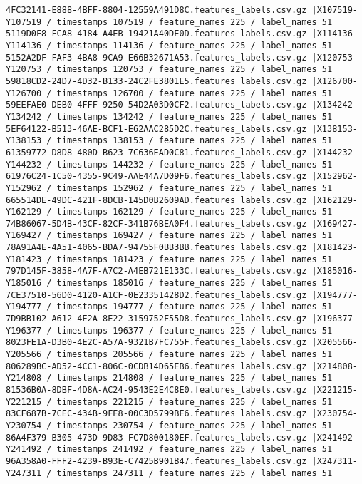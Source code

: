 \documentclass{UoNMCHA}
\numberwithin{equation}{section}
\begin{document}
\begin{lstlisting}
4FC32141-E888-4BFF-8804-12559A491D8C.features_labels.csv.gz |X107519-Y107519 / timestamps 107519 / feature_names 225 / label_names 51
5119D0F8-FCA8-4184-A4EB-19421A40DE0D.features_labels.csv.gz |X114136-Y114136 / timestamps 114136 / feature_names 225 / label_names 51
5152A2DF-FAF3-4BA8-9CA9-E66B32671A53.features_labels.csv.gz |X120753-Y120753 / timestamps 120753 / feature_names 225 / label_names 51
59818CD2-24D7-4D32-B133-24C2FE3801E5.features_labels.csv.gz |X126700-Y126700 / timestamps 126700 / feature_names 225 / label_names 51
59EEFAE0-DEB0-4FFF-9250-54D2A03D0CF2.features_labels.csv.gz |X134242-Y134242 / timestamps 134242 / feature_names 225 / label_names 51
5EF64122-B513-46AE-BCF1-E62AAC285D2C.features_labels.csv.gz |X138153-Y138153 / timestamps 138153 / feature_names 225 / label_names 51
61359772-D8D8-480D-B623-7C636EAD0C81.features_labels.csv.gz |X144232-Y144232 / timestamps 144232 / feature_names 225 / label_names 51
61976C24-1C50-4355-9C49-AAE44A7D09F6.features_labels.csv.gz |X152962-Y152962 / timestamps 152962 / feature_names 225 / label_names 51
665514DE-49DC-421F-8DCB-145D0B2609AD.features_labels.csv.gz |X162129-Y162129 / timestamps 162129 / feature_names 225 / label_names 51
74B86067-5D4B-43CF-82CF-341B76BEA0F4.features_labels.csv.gz |X169427-Y169427 / timestamps 169427 / feature_names 225 / label_names 51
78A91A4E-4A51-4065-BDA7-94755F0BB3BB.features_labels.csv.gz |X181423-Y181423 / timestamps 181423 / feature_names 225 / label_names 51
797D145F-3858-4A7F-A7C2-A4EB721E133C.features_labels.csv.gz |X185016-Y185016 / timestamps 185016 / feature_names 225 / label_names 51
7CE37510-56D0-4120-A1CF-0E23351428D2.features_labels.csv.gz |X194777-Y194777 / timestamps 194777 / feature_names 225 / label_names 51
7D9BB102-A612-4E2A-8E22-3159752F55D8.features_labels.csv.gz |X196377-Y196377 / timestamps 196377 / feature_names 225 / label_names 51
8023FE1A-D3B0-4E2C-A57A-9321B7FC755F.features_labels.csv.gz |X205566-Y205566 / timestamps 205566 / feature_names 225 / label_names 51
806289BC-AD52-4CC1-806C-0CDB14D65EB6.features_labels.csv.gz |X214808-Y214808 / timestamps 214808 / feature_names 225 / label_names 51
81536B0A-8DBF-4D8A-AC24-9543E2E4C8E0.features_labels.csv.gz |X221215-Y221215 / timestamps 221215 / feature_names 225 / label_names 51
83CF687B-7CEC-434B-9FE8-00C3D5799BE6.features_labels.csv.gz |X230754-Y230754 / timestamps 230754 / feature_names 225 / label_names 51
86A4F379-B305-473D-9D83-FC7D800180EF.features_labels.csv.gz |X241492-Y241492 / timestamps 241492 / feature_names 225 / label_names 51
96A358A0-FFF2-4239-B93E-C7425B901B47.features_labels.csv.gz |X247311-Y247311 / timestamps 247311 / feature_names 225 / label_names 51

\end{lstlisting}
\end{document}
